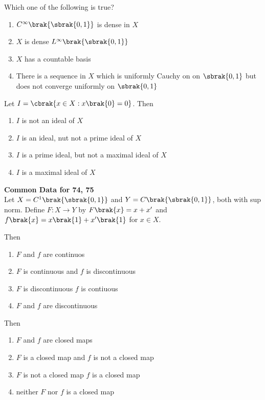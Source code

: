 	\item[72.] Which one of the following is true?

		\hfill{}
		\begin{enumerate}
            \item $C^{\infty}\brak{\sbrak{0, 1}}$ is dense in $X$
            \item $X$ is dense $L^{\infty}\brak{\sbrak{0, 1}}$
			\item $X$ has a countable basis
            \item There is a sequence in $X$ which is uniformly Cauchy on on $\sbrak{0, 1}$ but does not converge uniformly on $\sbrak{0, 1}$
		\end{enumerate}

    \item[73.] Let $I = \cbrak{x \in X : x\brak{0} = 0}$. Then 
		
		\hfill{}
		\begin{enumerate}
			\item $I$ is not an ideal of $X$
			\item $I$ is an ideal, nut not a prime ideal of $X$
			\item $I$ is a prime ideal, but not a maximal ideal of $X$
			\item $I$ is a maximal ideal of $X$
		\end{enumerate}


        \textbf{Common Data for 74, 75}\\
        Let $X = C^1\brak{\sbrak{0, 1}}$ and $Y = C\brak{\sbrak{0, 1}}$, both with sup norm. Define
        $F : X \rightarrow Y$ by $F\brak{x} = x + x^{\prime}$ and $f\brak{x} = x\brak{1} + x^{\prime}\brak{1}$
        for $x \in X$.
	\item[74.] Then
		\hfill{}
\begin{enumerate}
			\item $F$ and $f$ are continuos
			\item $F$ is continuous and $f$ is discontinuous
			\item $F$ is discontinuous $f$ is contiuous
			\item $F$ and $f$ are discontinuous
		\end{enumerate}
\item[75.] Then
		\hfill{}
\begin{enumerate}
			\item $F$ and $f$ are closed maps
			\item $F$ is a closed map and $f$ is not a closed map 
			\item $F$ is not a closed map $f$ is a closed map
			\item neither $F$ nor $f$ is a closed map
		\end{enumerate}
        
